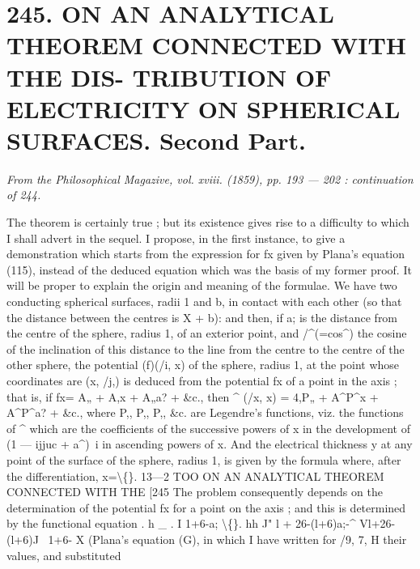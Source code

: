 \documentclass[11pt,a4paper]{book}
\begin{document}
\section*{245. ON  AN  ANALYTICAL  THEOREM  CONNECTED  WITH  THE  DIS- TRIBUTION OF  ELECTRICITY  ON  SPHERICAL  SURFACES. Second  Part.}
\begin{flushright}
\textit{From  the  Philosophical  Magazive,  vol.  xviii.  (1859),  pp.  193 — 202 :   continuation  of  244.}\n\end{flushright}
\vspace{0.5em}
The  theorem  is  certainly  true ;  but  its  existence  gives  rise  to  a  difficulty  to  which
I  shall  advert  in  the  sequel.  I  propose,  in  the  first  instance,  to  give  a  demonstration
which  starts  from  the  expression  for  fx  given  by  Plana's  equation  (115),  instead  of
the  deduced  equation  which  was  the  basis  of  my  former  proof.  It  will  be  proper  to
explain  the  origin  and  meaning  of  the  formulae.  We  have  two  conducting  spherical
surfaces,  radii  1  and  b,  in  contact  with  each  other  (so  that  the  distance  between  the
centres  is  X  +  b):  and  then,  if  a;  is  the  distance  from  the  centre  of  the  sphere,  radius
1,  of  an  exterior  point,  and  /^(=cos^)  the  cosine  of  the  inclination  of  this  distance  to
the  line  from  the  centre  to  the  centre  of  the  other  sphere,  the  potential  (f)(/i,  x)  of
the  sphere,  radius  1,  at  the  point  whose  coordinates  are  (x,  /j,)  is  deduced  from  the
potential  fx  of  a  point  in  the  axis ;    that  is,  if
fx=  A„     +  A,x      +  A„a?      +  \&c.,
then
^  (/x,  x)  =  4,P„  +  A^P^x  +  A^P^a?  +  \&c.,
where  P,,  P,,  P,,  \&c.  are  Legendre's  functions,  viz.  the  functions  of  ^  which  are  the
coefficients  of  the  successive  powers  of  x  in  the  development  of  (1  —  ijjuc  +  a^)~i  in
ascending  powers  of  x.  And  the  electrical  thickness  y  at  any  point  of  the  surface
of  the   sphere,  radius    1,   is   given   by   the   formula
where,  after  the  differentiation,  x=\textbackslash\{\}.
13—2
TOO  ON    AN   ANALYTICAL   THEOREM    CONNECTED    WITH   THE  [245
The  problem   consequently  depends   on   the   determination    of    the    potential  fx    for
a  point  on  the  axis ;  and  this  is  determined  by  the  functional  equation
.   h  _    .  I       1+6-a;       \textbackslash\{\}.  hh
J"     l  +  26-(l+6)a;-^  Vl+26-(l+6)J~        1+6-
X
(Plana's  equation  (G),  in  which  I  have  written  for  /9,  7,  H  their  values,  and  substituted
\end{document}
